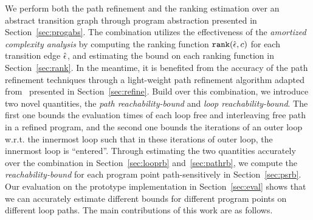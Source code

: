 We perform both the path refinement and the ranking estimation over an abstract transition graph through program abstraction presented in Section~\ref{sec:progabs}.
The combination utilizes the effectiveness of the \emph{amortized complexity analysis} by computing the ranking function $\mathtt{rank}(\hat{\mathtt{\epsilon}{}}, c)$ for each transition edge $\hat{\mathtt{\epsilon}{}}$, and estimating the bound on each ranking function in Section~\ref{sec:rank}.
In the meantime, it is benefited from the accuracy of the path refinement techniques through a light-weight path refinement algorithm adapted from~\cite{GulwaniJK09} presented in Section~\ref{sec:refine}.
Build over this combination, we introduce two novel quantities,
the \emph{path reachability-bound} and \emph{loop reachability-bound}.
The first one bounds the evaluation times of each loop free and interleaving free path in a refined program, and the second one bounds the iterations of an outer loop w.r.t. the innermost loop such that in these iterations of outer loop, the innermost loop is ``entered''. 
Through estimating the two quantities accurately over the combination in Section~\ref{sec:looprb} and~\ref{sec:pathrb}, we compute the \emph{reachability-bound} for each program point path-sensitively in Section~\ref{sec:psrb}.
Our evaluation on the prototype implementation in Section~\ref{sec:eval} shows that we can accurately estimate different bounds for different program points on different loop paths. The main contributions of this work are as follows.
